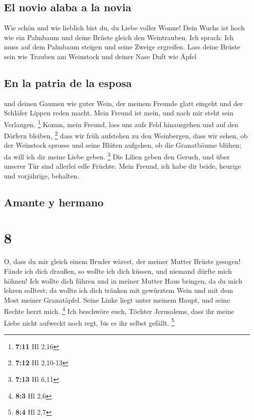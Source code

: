\hypertarget{el-novio-alaba-a-la-novia}{%
\subsection{El novio alaba a la novia}\label{el-novio-alaba-a-la-novia}}

 Wie schön und wie lieblich bist du, du Liebe voller
Wonne!  Dein Wuchs ist hoch wie ein Palmbaum und deine
Brüste gleich den Weintrauben.  Ich sprach: Ich muss auf
dem Palmbaum steigen und seine Zweige ergreifen. Lass deine Brüste sein
wie Trauben am Weinstock und deiner Nase Duft wie Äpfel

\hypertarget{en-la-patria-de-la-esposa}{%
\subsection{En la patria de la esposa}\label{en-la-patria-de-la-esposa}}

 und deinen Gaumen wie guter Wein, der meinem Freunde
glatt eingeht und der Schläfer Lippen reden macht.  Mein
Freund ist mein, und nach mir steht sein Verlangen. \footnote{\textbf{7:11}
  Hl 2,16}  Komm, mein Freund, lass uns aufs Feld
hinausgehen und auf den Dörfern bleiben, \footnote{\textbf{7:12} Hl
  2,10-13}  dass wir früh aufstehen zu den Weinbergen,
dass wir sehen, ob der Weinstock sprosse und seine Blüten aufgehen, ob
die Granatbäume blühen; da will ich dir meine Liebe geben. \footnote{\textbf{7:13}
  Hl 6,11}  Die Lilien geben den Geruch, und über unserer
Tür sind allerlei edle Früchte. Mein Freund, ich habe dir beide, heurige
und vorjährige, behalten.

\hypertarget{amante-y-hermano}{%
\subsection{Amante y hermano}\label{amante-y-hermano}}

\hypertarget{section-7}{%
\section{8}\label{section-7}}

 O, dass du mir gleich einem Bruder wärest, der meiner
Mutter Brüste gesogen! Fände ich dich draußen, so wollte ich dich
küssen, und niemand dürfte mich höhnen!  Ich wollte dich
führen und in meiner Mutter Haus bringen, da du mich lehren solltest; da
wollte ich dich tränken mit gewürztem Wein und mit dem Most meiner
Granatäpfel.  Seine Linke liegt unter meinem Haupt, und
seine Rechte herzt mich. \footnote{\textbf{8:3} Hl 2,6} 
Ich beschwöre euch, Töchter Jerusalems, dass ihr meine Liebe nicht
aufweckt noch regt, bis es ihr selbst gefällt. \footnote{\textbf{8:4} Hl
  2,7}

